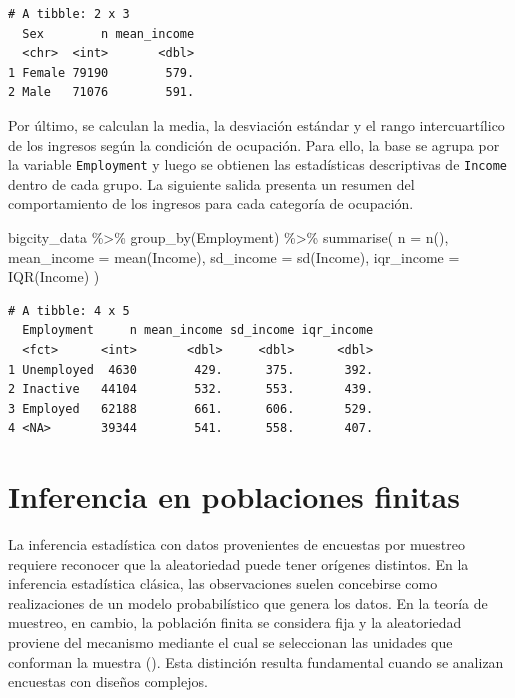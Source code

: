 \documentclass[
  spanish,
  11pt,
  letterpaper,
  oneside,
  open=any]{scrbook}
\newenvironment{Shaded}{\begin{snugshade}}{\end{snugshade}}
\newcommand{\AttributeTok}[1]{\textcolor[rgb]{0.40,0.45,0.13}{#1}}
\newcommand{\FunctionTok}[1]{\textcolor[rgb]{0.28,0.35,0.67}{#1}}
\newcommand{\NormalTok}[1]{\textcolor[rgb]{0.00,0.23,0.31}{#1}}
\newcommand{\SpecialCharTok}[1]{\textcolor[rgb]{0.37,0.37,0.37}{#1}}
\begin{document}
\begin{verbatim}
# A tibble: 2 x 3
  Sex        n mean_income
  <chr>  <int>       <dbl>
1 Female 79190        579.
2 Male   71076        591.
\end{verbatim}

Por último, se calculan la media, la desviación estándar y el rango
intercuartílico de los ingresos según la condición de ocupación. Para
ello, la base se agrupa por la variable \texttt{Employment} y luego se
obtienen las estadísticas descriptivas de \texttt{Income} dentro de cada
grupo. La siguiente salida presenta un resumen del comportamiento de los
ingresos para cada categoría de ocupación.

\begin{Shaded}
\begin{Highlighting}[]
\NormalTok{bigcity\_data }\SpecialCharTok{\%\textgreater{}\%}
  \FunctionTok{group\_by}\NormalTok{(Employment) }\SpecialCharTok{\%\textgreater{}\%}
  \FunctionTok{summarise}\NormalTok{(}
    \AttributeTok{n =} \FunctionTok{n}\NormalTok{(),}
    \AttributeTok{mean\_income =} \FunctionTok{mean}\NormalTok{(Income),}
    \AttributeTok{sd\_income =} \FunctionTok{sd}\NormalTok{(Income),}
    \AttributeTok{iqr\_income =} \FunctionTok{IQR}\NormalTok{(Income)}
\NormalTok{  )}
\end{Highlighting}
\end{Shaded}

\begin{verbatim}
# A tibble: 4 x 5
  Employment     n mean_income sd_income iqr_income
  <fct>      <int>       <dbl>     <dbl>      <dbl>
1 Unemployed  4630        429.      375.       392.
2 Inactive   44104        532.      553.       439.
3 Employed   62188        661.      606.       529.
4 <NA>       39344        541.      558.       407.
\end{verbatim}

\chapter{Inferencia en poblaciones finitas}\label{ap2}

La inferencia estadística con datos provenientes de encuestas por
muestreo requiere reconocer que la aleatoriedad puede tener orígenes
distintos. En la inferencia estadística clásica, las observaciones
suelen concebirse como realizaciones de un modelo probabilístico que
genera los datos. En la teoría de muestreo, en cambio, la población
finita se considera fija y la aleatoriedad proviene del mecanismo
mediante el cual se seleccionan las unidades que conforman la muestra
(). Esta distinción resulta
fundamental cuando se analizan encuestas con diseños complejos.
\end{document}
